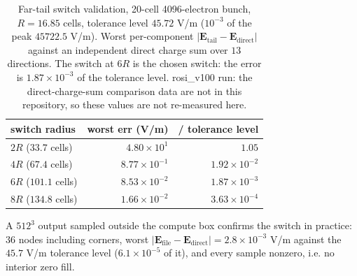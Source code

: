 \begin{table}[t]
\centering
\small
\caption{Far-tail switch validation, 20-cell 4096-electron bunch,
$R=16.85$ cells, tolerance level $45.72$ V/m ($10^{-3}$ of the peak
$45722.5$ V/m). Worst per-component
$|\mathbf{E}_{\mathrm{tail}}-\mathbf{E}_{\mathrm{direct}}|$ against an
independent direct charge sum over $13$ directions. The switch at $6R$ is
the chosen switch: the error is $1.87\times10^{-3}$ of the tolerance level.
rosi\_v100 run: the direct-charge-sum comparison data are not in this
repository, so these values are not re-measured here.}
\label{tab:margin}
\begin{tabular}{lrr}
\toprule
switch radius & worst err (V/m) & / tolerance level \\
\midrule
$2R$ ($33.7$ cells) & $4.80\times10^{1}$ & $1.05$ \\
$4R$ ($67.4$ cells) & $8.77\times10^{-1}$ & $1.92\times10^{-2}$ \\
$6R$ ($101.1$ cells) & $8.53\times10^{-2}$ & $1.87\times10^{-3}$ \\
$8R$ ($134.8$ cells) & $1.66\times10^{-2}$ & $3.63\times10^{-4}$ \\
\bottomrule
\end{tabular}
\end{table}

A $512^{3}$ output sampled outside the compute box confirms the
switch in practice: $36$ nodes including corners, worst
$|\mathbf{E}_{\mathrm{file}}-\mathbf{E}_{\mathrm{direct}}| = 2.8\times10^{-3}$
V/m against the $45.7$ V/m tolerance level ($6.1\times10^{-5}$ of it), and
every sample nonzero, i.e. no interior zero fill.
